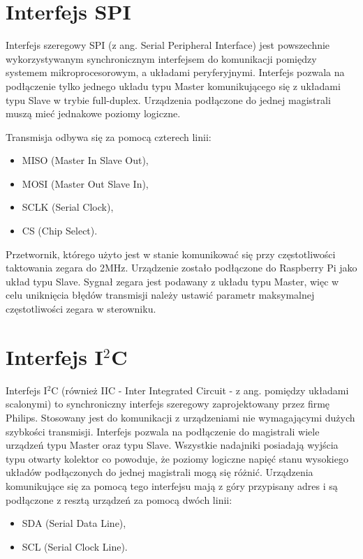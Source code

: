 \section{Interfejs SPI}

Interfejs szeregowy SPI (z ang. Serial Peripheral Interface)
jest powszechnie wykorzystywanym synchronicznym interfejsem do komunikacji pomiędzy systemem mikroprocesorowym, a układami peryferyjnymi. Interfejs pozwala na podłączenie tylko jednego układu typu Master komunikującego się z układami typu Slave w trybie full-duplex. Urządzenia podłączone do jednej magistrali muszą mieć jednakowe poziomy logiczne.

\newpage

Transmisja odbywa się za pomocą czterech linii:
\begin{itemize}
\item MISO (Master In Slave Out), 
\item MOSI (Master Out Slave In),
\item SCLK (Serial Clock),
\item CS (Chip Select).
\end{itemize}

Przetwornik, którego użyto jest w stanie komunikować się przy częstotliwości taktowania zegara do 2MHz. Urządzenie zostało podłączone do Raspberry Pi jako układ typu Slave. Sygnał zegara jest podawany z układu typu Master, więc w celu uniknięcia błędów transmisji należy ustawić parametr maksymalnej częstotliwości zegara w sterowniku. 


\section{Interfejs I$^2$C}

Interfejs I$^2$C (również IIC - Inter Integrated Circuit - z ang. pomiędzy układami scalonymi) to synchroniczny interfejs szeregowy zaprojektowany przez firmę Philips. Stosowany jest do komunikacji z urządzeniami nie wymagającymi dużych szybkości transmisji. Interfejs pozwala na podłączenie do magistrali wiele urządzeń typu Master oraz typu Slave. Wszystkie nadajniki posiadają wyjścia typu otwarty kolektor co powoduje, że poziomy logiczne napięć stanu wysokiego układów podłączonych do jednej magistrali mogą się różnić. Urządzenia komunikujące się za pomocą tego interfejsu mają z góry przypisany adres i są podłączone z resztą urządzeń za pomocą dwóch linii: 
\begin{itemize}
\item SDA (Serial Data Line),
\item SCL (Serial Clock Line).
\end{itemize}

